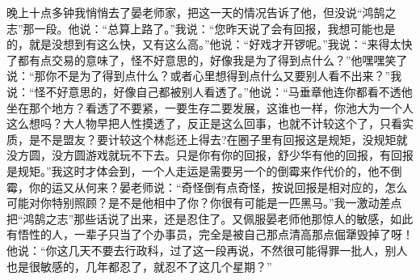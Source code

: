 \documentclass[12pt,oneside]{book}
\begin{document}
晚上十点多钟我悄悄去了晏老师家，把这一天的情况告诉了他，但没说``鸿鹄之志''那一段。他说：``总算上路了。''我说：``您昨天说了会有回报，我想可能也是的，就是没想到有这么快，又有这么高。''他说：``好戏才开锣呢。''我说：``来得太快了都有点交易的意味了，怪不好意思的，好像我是为了得到点什么？''他嘿嘿笑了说：``那你不是为了得到点什么？或者心里想得到点什么又要别人看不出来？''我说：``怪不好意思的，好像自己都被别人看透了。''他说：``马垂章他连你都看不透他坐在那个地方？看透了不要紧，一要生存二要发展，这谁也一样，你池大为一个人这么想吗？大人物早把人性摸透了，反正是这么回事，也就不计较这个了，只看实质，是不是盟友？要计较这个林彪还上得去?在圈子里有回报这是规矩，没规矩就没方圆，没方圆游戏就玩不下去。只是你有你的回报，舒少华有他的回报，有回报是规矩。''我这时才体会到，一个人走运是需要另一个的倒霉来作代价的，他不倒霉，你的运又从何来？晏老师说：``奇怪倒有点奇怪，按说回报是相对应的，怎么可能对你特别照顾？是不是他相中了你？你很有可能是一匹黑马。''我一激动差点把``鸿鹄之志''那些话说了出来，还是忍住了。又佩服晏老师他那惊人的敏感，如此有悟性的人，一辈子只当了个办事员，完全是被自己那点清高那点倔犟毁掉了呀！他说：``你这几天不要去行政科，过了这一段再说，不然很可能得罪一批人，别人也是很敏感的，几年都忍了，就忍不了这几个星期？''
\end{document}
